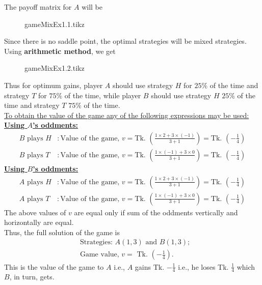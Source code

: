 \documentclass[../main-sheet.tex]{subfiles}
\begin{document}
    \begin{soln}
        The payoff matrix for \(A\) will be 
        \begin{figure}[H]
            \centering
            {gameMixEx1.1.tikz}
        \end{figure}
        Since there is no saddle point, the optimal strategies will be mixed strategies.\\
        Using \textbf{arithmetic method}, we get
        \begin{figure}[H]
            \centering
            {gameMixEx1.2.tikz}
        \end{figure}
        Thus for optimum gains, player \(A\) should use strategy \(H\) for \(25 \% \) of the time and strategy \(T\) for \(75 \% \) of the time, while player \(B\) should use strategy \(H\) \(25 \% \) of the time and strategy \(T\) \(75 \% \) of the time.\\

        \underline{To obtain the value of the game any of the following expressions may be used:}\\
        \textbf{\underline{Using \(A\)'s oddments:}}\\
        \begin{align*}
            B \text{ plays } H &: \text{Value of the game, } v=\text{Tk. }\left( \frac{1\times 2+3\times (-1)}{3+1} \right)=\text{Tk. }\left( -\frac{1}{4} \right)\\
            B \text{ plays } T &: \text{Value of the game, } v=\text{Tk. }\left( \frac{1\times (-1)+3\times 0}{3+1} \right)=\text{Tk. }\left( -\frac{1}{4} \right)
        \end{align*}
        \textbf{\underline{Using \(B\)'s oddments:}}\\
        \begin{align*}
            A \text{ plays } H &: \text{Value of the game, } v=\text{Tk. }\left( \frac{1\times 2+3\times (-1)}{3+1} \right)=\text{Tk. }\left( -\frac{1}{4} \right)\\
            A \text{ plays } T &: \text{Value of the game, } v=\text{Tk. }\left( \frac{1\times (-1)+3\times 0}{3+1} \right)=\text{Tk. }\left( -\frac{1}{4} \right)
        \end{align*}
        The above values of \(v\) are equal only if sum of the oddments vertically and horizontally are equal.\\
        Thus, the full solution of the game is 
        \begin{align*}
            &\text{Strategies: } A(1,3)\text{ and } B(1,3);\\
            &\text{Game value, }v=\text{ Tk. } \left( -\frac{1}{4} \right).
        \end{align*}
        This is the value of the game to \(A\) i.e., \(A\) gains Tk. \(-\frac{1}{4}\) i.e., he loses Tk. \(\frac{1}{4}\) which \(B\), in turn, gets.\\


\end{soln}
\end{document}
